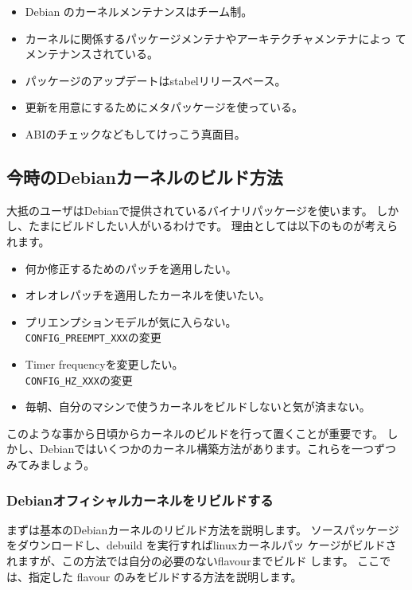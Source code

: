 \documentclass[mingoth,a4paper]{jsarticle}
\begin{document}
\begin{itemize}
\item Debian のカーネルメンテナンスはチーム制。
\item カーネルに関係するパッケージメンテナやアーキテクチャメンテナによっ
      てメンテナンスされている。
\item パッケージのアップデートはstabelリリースベース。
\item 更新を用意にするためにメタパッケージを使っている。
\item ABIのチェックなどもしてけっこう真面目。
\end{itemize}

\subsection{今時のDebianカーネルのビルド方法}

大抵のユーザはDebianで提供されているバイナリパッケージを使います。
しかし、たまにビルドしたい人がいるわけです。
理由としては以下のものが考えられます。

\begin{itemize}
\item 何か修正するためのパッチを適用したい。
\item オレオレパッチを適用したカーネルを使いたい。
\item プリエンプションモデルが気に入らない。\\
\texttt{CONFIG\_PREEMPT\_XXX}の変更
\item Timer frequencyを変更したい。\\
\texttt{CONFIG\_HZ\_XXX}の変更
\item 毎朝、自分のマシンで使うカーネルをビルドしないと気が済まない。
\end{itemize}

このような事から日頃からカーネルのビルドを行って置くことが重要です。
しかし、Debianではいくつかのカーネル構築方法があります。これらを一つずつ
みてみましょう。

\subsubsection{Debianオフィシャルカーネルをリビルドする}

まずは基本のDebianカーネルのリビルド方法を説明します。
ソースパッケージをダウンロードし、debuild を実行すればlinuxカーネルパッ
ケージがビルドされますが、この方法では自分の必要のないflavourまでビルド
します。
ここでは、指定した flavour のみをビルドする方法を説明します。
\end{document}
